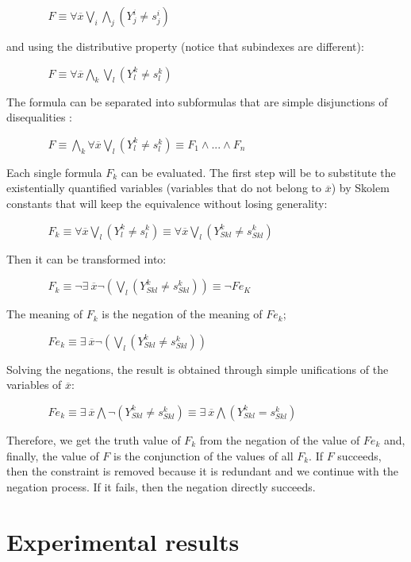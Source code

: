 \documentclass{tlp}
\begin{document}
$~~~~~~~~~~~~~~~~~ F \equiv \forall \overline{x} \bigvee_i\bigwedge_j (Y_j^i \neq s_j^i) $

\noindent
and using the distributive property (notice that subindexes are different):

$~~~~~~~~~~~~~~~~~ F \equiv \forall \overline{x} \bigwedge_k\bigvee_l (Y_l^k \neq s_l^k) $

The formula can be separated into subformulas that are simple
disjunctions of disequalities :

 $~~~~~~~~~~~~~~~~~ F \equiv \bigwedge_k \forall \overline{x} \bigvee_l (Y_l^k \neq s_l^k) \equiv F_1 \wedge ... \wedge F_n$

Each single formula $F_k$ can be evaluated. The first step will be to
substitute the existentially quantified variables (variables that do not
belong to $\overline{x}$) by Skolem constants that will keep
the equivalence without losing generality:

$~~~~~~~~~~~~~~~~~  F_k \equiv \forall \overline{x} \bigvee_l ( Y_l^k \neq s_l^k ) \equiv \forall \overline{x} \bigvee_l ( Y_{Sk l}^k \neq s_{Sk l}^k )  $

Then it can be transformed into:

$~~~~~~~~~~~~~~~~~ F_k \equiv  \neg \exists ~ \overline{x} \neg ( \bigvee_l (Y_{Sk l}^k \neq s_{Sk l}^k) ) \equiv \neg Fe_K $

The meaning of $F_k$ is the negation of the meaning of $Fe_k$;

$~~~~~~~~~~~~~~~~~ Fe_k \equiv \exists ~ \overline{x} \neg ( \bigvee_l (Y_{Sk l}^k \neq s_{Sk l}^k)) $
 
Solving the negations, the result is obtained through simple unifications of the variables of $\overline{x}$:

$~~~~~~~~~~~~~~~~~  Fe_k  \equiv \exists ~ \overline{x} \bigwedge \neg (Y_{Sk l}^k \neq s_{Sk l}^k)  \equiv \exists ~ \overline{x} \bigwedge (Y_{Sk l}^k = s_{Sk l}^k)  $

        Therefore, we get the truth value of $F_k$ from the
        negation of the value of $Fe_k$ and, finally, the value of $F$ is
        the conjunction of the values of all $F_k$. If $F$
        succeeds, then the constraint is removed because it is redundant
        and we continue with the negation process. If it fails, then
        the negation directly succeeds.


\section{Experimental results}
\label{results}
\end{document}
